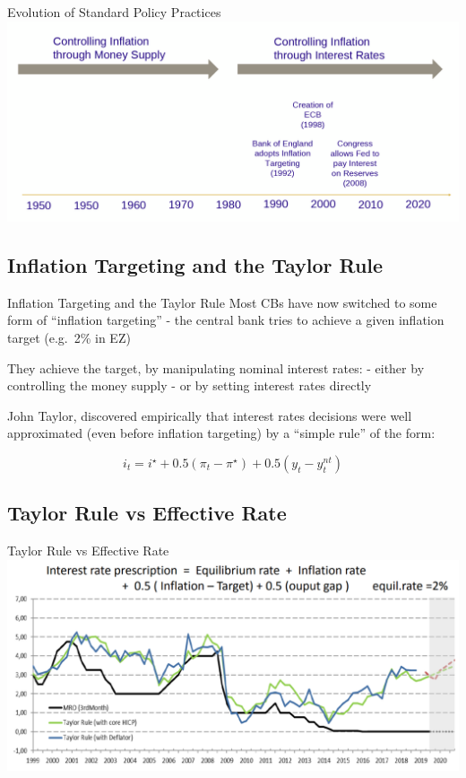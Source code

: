 \documentclass[
  ignorenonframetext,
  aspectratio=169,
]{beamer}
\begin{document}
\begin{frame}{Evolution of Standard Policy Practices}
\includegraphics{evolution_practices.png}
\end{frame}

\subsection{Inflation Targeting and the Taylor
Rule}\label{inflation-targeting-and-the-taylor-rule}

\begin{frame}{Inflation Targeting and the Taylor Rule}
Most CBs have now switched to some form of ``inflation targeting'' - the
central bank tries to achieve a given inflation target (e.g.~2\% in EZ)

They achieve the target, by manipulating nominal interest rates: -
either by controlling the money supply - or by setting interest rates
directly

John Taylor, discovered empirically that interest rates decisions were
well approximated (even before inflation targeting) by a ``simple rule''
of the form:

\[i_t = i^{\star} + 0.5 (\pi_t - \pi^ {\star}) + 0.5 (y_t - y_t^ {nt})\]
\end{frame}

\subsection{Taylor Rule vs Effective
Rate}\label{taylor-rule-vs-effective-rate}

\begin{frame}{Taylor Rule vs Effective Rate}
\includegraphics{taylor_rule_vs_effective_1.png}
\end{frame}
\end{document}
